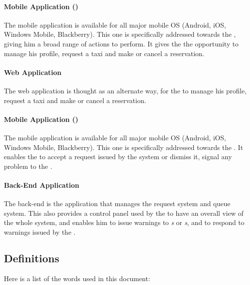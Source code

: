 \paragraph{Mobile Application (\emph{})}
\label{app:mobileuser}
  The mobile application is available for all major mobile OS (Android, iOS, Windows Mobile, Blackberry).
  This one is specifically addressed towards the \emph{}, giving him a broad range of actions to perform.
  It gives the \emph{} the opportunity to manage his profile, request a taxi and make or cancel a reservation. 

\paragraph{Web Application} %
  \label{app:web}
  The web application is thought as an alternate way, for the \emph{} to manage his profile, request a taxi and make or cancel a reservation.

\paragraph{Mobile Application (\emph{})} %
  \label{app:mobiledriver}
  The mobile application is available for all major mobile OS (Android, iOS, Windows Mobile, Blackberry).
  This one is specifically addressed towards the \emph{}.
  It enables the \emph{} to accept a request issued by the system or dismiss it, signal any problem to the \emph{}.



\paragraph{Back-End Application} %
  \label{app:backend}
  The back-end is the application that manages the request system and queue system. This also provides a control panel used by the \emph{} to have an overall view of the whole system, and enables him to issue warnings to \emph{s} or \emph{s}, and to respond to warnings issued by the \emph{}.
\subsection{Definitions}
\label{sub:def}
Here is a list of the words used in this document:

